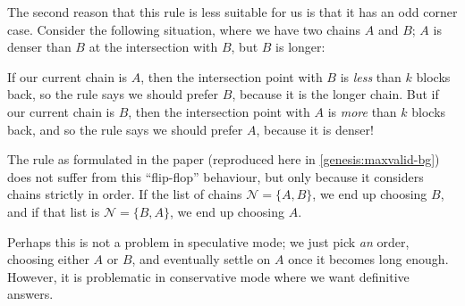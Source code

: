 The second reason that this rule is less suitable for us is that it has an odd
corner case. Consider the following situation, where we have two chains $A$
and $B$; $A$ is denser than $B$ at the intersection with $B$, but $B$
is longer:
%
\begin{center}
\end{center}
%
If our current chain is $A$, then the intersection point with $B$ is \emph{less}
than $k$ blocks back, so the rule says we should prefer $B$, because it is the
longer chain. But if our current chain is $B$, then the intersection point with
$A$ is \emph{more} than $k$ blocks back, and so the rule says we should prefer
$A$, because it is denser!

The rule as formulated in the paper (reproduced here
in \cref{genesis:maxvalid-bg}) does not suffer from this ``flip-flop''
behaviour, but only because it considers chains strictly in order. If the list
of chains $\mathcal{N} = \{ A, B \}$, we end up choosing $B$, and if that list
is $\mathcal{N} = \{ B, A \}$, we end up choosing $A$.

Perhaps this is not a problem in speculative mode; we just pick \emph{an} order,
choosing either $A$ or $B$, and eventually settle on $A$ once it becomes long
enough. However, it is problematic in conservative mode where we want
definitive answers.

